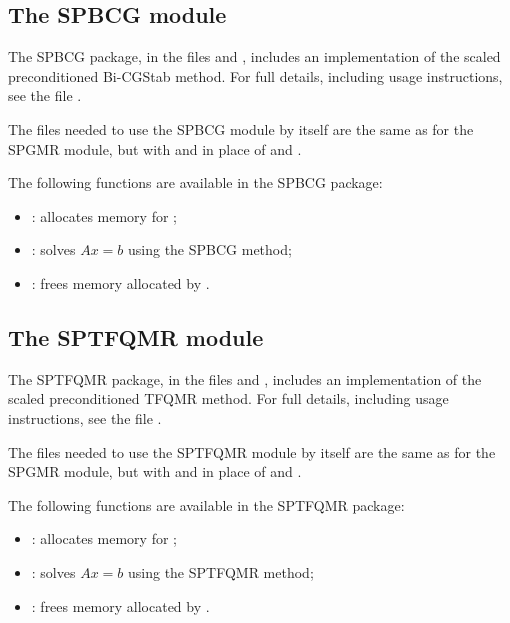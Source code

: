 \documentclass[letterpaper,10pt,english]{sphinxmanual}
\begin{document}
\subsection{The SPBCG module}
\label{linear_solvers/SPILS:the-spbcg-module}
The SPBCG package, in the files  and
, includes an implementation of the scaled
preconditioned Bi-CGStab method. For full details, including usage
instructions, see the file .

The files needed to use the SPBCG module by itself are the same as for
the SPGMR module, but with  and
 in place of  and
.

The following functions are available in the SPBCG package:
\begin{itemize}
\item {} 
: allocates memory for ;

\item {} 
: solves $Ax = b$ using the SPBCG method;

\item {} 
: frees memory allocated by .

\end{itemize}


\subsection{The SPTFQMR module}
\label{linear_solvers/SPILS:the-sptfqmr-module}
The SPTFQMR package, in the files  and
, includes an implementation of the scaled
preconditioned TFQMR method. For full details, including usage
instructions, see the file .

The files needed to use the SPTFQMR module by itself are the same as
for the SPGMR module, but with  and
 in place of  and
.

The following functions are available in the SPTFQMR package:
\begin{itemize}
\item {} 
: allocates memory for ;

\item {} 
: solves $Ax = b$ using the SPTFQMR method;

\item {} 
: frees memory allocated by .

\end{itemize}
\end{document}
